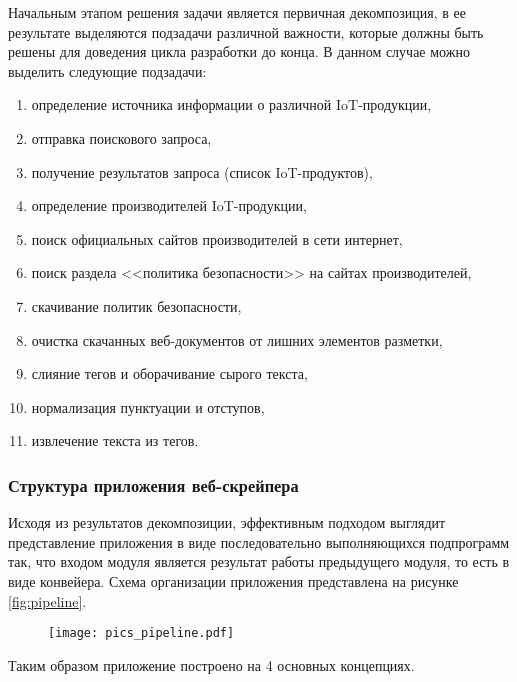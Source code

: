 \documentclass[../main]{subfiles}
\begin{document}
Начальным этапом решения задачи является первичная декомпозиция, в ее результате выделяются подзадачи различной важности, которые должны быть решены для доведения цикла разработки до конца. В данном случае можно выделить следующие подзадачи:
\begin{enumerate}
    \item определение источника информации о различной IoT-продукции,
    \item отправка поискового запроса,
    \item получение результатов запроса (список IoT-продуктов),
    \item определение производителей IoT-продукции,
    \item поиск официальных сайтов производителей в сети интернет,
    \item поиск раздела <<политика безопасности>> на сайтах производителей,
    \item скачивание политик безопасности,
    \item очистка скачанных веб-документов от лишних элементов разметки,
    \item слияние тегов и оборачивание сырого текста,
    \item нормализация пунктуации и отступов,
    \item извлечение текста из тегов.
\end{enumerate}

\subsubsection{Структура приложения веб-скрейпера}
Исходя из результатов декомпозиции, эффективным подходом выглядит представление приложения в виде последовательно выполняющихся подпрограмм так, что входом модуля является результат работы предыдуще\-го модуля, то есть в виде конвейера. Схема организации приложения представлена на рисунке \ref{fig:pipeline}.

\begin{figure}[H]
    \centering
    {\texttt{[image: pics\_pipeline.pdf]}}
    \vspace{-\baselineskip}
\end{figure}

Таким образом приложение построено на 4 основных концепциях.
\end{document}
